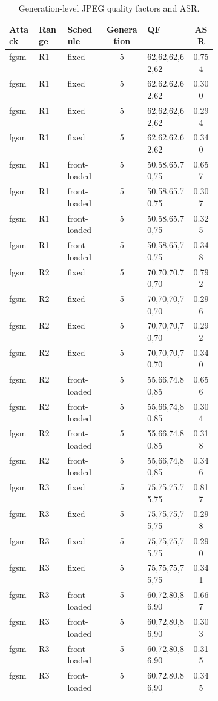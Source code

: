 \begin{table}[t]
\caption{Generation-level JPEG quality factors and ASR.}
\label{tab:generation-asr}
\centering
\scriptsize
\begin{tabular}{llp{0.18\linewidth}cp{0.22\linewidth}c}
\hline
Attack & Range & Schedule & Generation & QF & ASR \\
\hline
fgsm & R1 & fixed & 5 & 62,62,62,62,62 & 0.754 \\
fgsm & R1 & fixed & 5 & 62,62,62,62,62 & 0.300 \\
fgsm & R1 & fixed & 5 & 62,62,62,62,62 & 0.294 \\
fgsm & R1 & fixed & 5 & 62,62,62,62,62 & 0.340 \\
fgsm & R1 & front-loaded & 5 & 50,58,65,70,75 & 0.657 \\
fgsm & R1 & front-loaded & 5 & 50,58,65,70,75 & 0.307 \\
fgsm & R1 & front-loaded & 5 & 50,58,65,70,75 & 0.325 \\
fgsm & R1 & front-loaded & 5 & 50,58,65,70,75 & 0.348 \\
fgsm & R2 & fixed & 5 & 70,70,70,70,70 & 0.792 \\
fgsm & R2 & fixed & 5 & 70,70,70,70,70 & 0.296 \\
fgsm & R2 & fixed & 5 & 70,70,70,70,70 & 0.292 \\
fgsm & R2 & fixed & 5 & 70,70,70,70,70 & 0.340 \\
fgsm & R2 & front-loaded & 5 & 55,66,74,80,85 & 0.656 \\
fgsm & R2 & front-loaded & 5 & 55,66,74,80,85 & 0.304 \\
fgsm & R2 & front-loaded & 5 & 55,66,74,80,85 & 0.318 \\
fgsm & R2 & front-loaded & 5 & 55,66,74,80,85 & 0.346 \\
fgsm & R3 & fixed & 5 & 75,75,75,75,75 & 0.817 \\
fgsm & R3 & fixed & 5 & 75,75,75,75,75 & 0.298 \\
fgsm & R3 & fixed & 5 & 75,75,75,75,75 & 0.290 \\
fgsm & R3 & fixed & 5 & 75,75,75,75,75 & 0.341 \\
fgsm & R3 & front-loaded & 5 & 60,72,80,86,90 & 0.667 \\
fgsm & R3 & front-loaded & 5 & 60,72,80,86,90 & 0.303 \\
fgsm & R3 & front-loaded & 5 & 60,72,80,86,90 & 0.315 \\
fgsm & R3 & front-loaded & 5 & 60,72,80,86,90 & 0.345 \\

\end{tabular}
\end{table}
